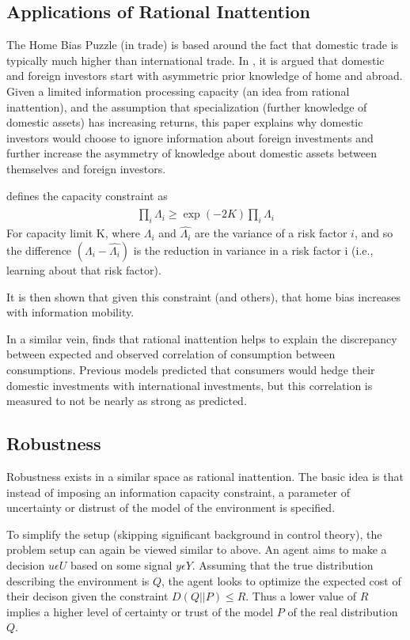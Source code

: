 \documentclass[10pt, twocolumn]{IEEEtran}
\begin{document}
\subsection{Applications of Rational Inattention}
The Home Bias Puzzle (in trade) is based around the fact that domestic trade is typically much higher than
international trade. In \cite{homeBias}, it is argued that domestic and foreign investors start with asymmetric prior knowledge of
home and abroad. Given a limited information processing capacity (an idea from rational inattention), and the assumption that specialization
(further knowledge of domestic assets) has increasing returns, this paper explains why domestic investors would choose to ignore information about foreign
investments and further increase the asymmetry of knowledge about domestic assets between themselves and foreign investors.

\cite{homeBias} defines the capacity constraint as
\begin{gather*}
  \prod_{i} \widehat{\Lambda_{i}} \ge \exp(-2K) \prod_{i} \Lambda_{i}
\end{gather*}
For capacity limit K, where $\Lambda_{i}$ and $\widehat{\Lambda_{i}}$ are the variance of a risk factor $i$, and so the difference
$(\Lambda_{i} - \widehat{\Lambda_{i}})$ is the reduction in variance in a risk factor i (i.e., learning about that risk factor).

It is then shown that given this constraint (and others), that home bias increases with information mobility.

In a similar vein, \cite{Li2017} finds that rational inattention helps to explain the discrepancy between expected and
observed correlation of consumption between consumptions. Previous models predicted that consumers would hedge their
domestic investments with international investments, but this correlation is measured to not be nearly as strong as
predicted.

\subsection{Robustness}
Robustness exists in a similar space as rational inattention. The basic idea is that instead of
imposing an information capacity constraint, a parameter of uncertainty or distrust of
the model of the environment is specified.

To simplify the setup (skipping significant background in control theory), the problem setup can
again be viewed similar to above. An agent aims to make a decision $u \epsilon U$ based on some signal $y \epsilon Y$.
Assuming that the true distribution describing the environment is $Q$, the agent looks to optimize the expected cost of
their decison given the constraint $D(Q||P) \le R$. Thus a lower value of $R$ implies a higher level of certainty or
trust of the model $P$ of the real distribution $Q$.
\end{document}
